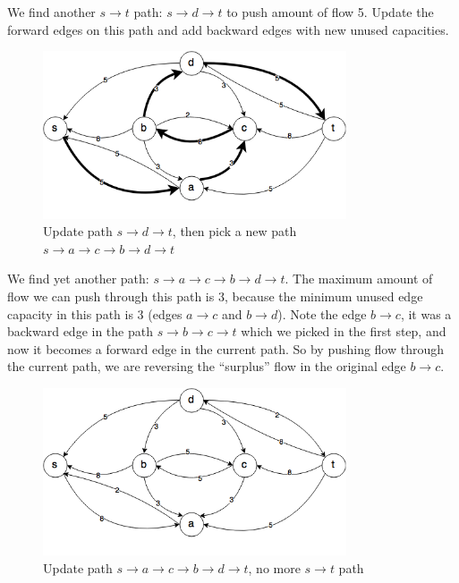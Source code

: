 \documentclass{article}
\begin{document}
We find another $s \rightarrow t$ path: $s \rightarrow d \rightarrow t$
to push amount of flow 5.
Update the forward edges on this path and add backward edges with new
unused capacities.

\begin{figure}[H]
\centering
\includegraphics[width=0.8\textwidth]{gf_3.png}
\caption{Update path $s \rightarrow d \rightarrow t$, 
then pick a new path $s \rightarrow a \rightarrow c \rightarrow b
\rightarrow d \rightarrow t$}
\end{figure}

We find yet another path: $s \rightarrow a \rightarrow c \rightarrow b
\rightarrow d \rightarrow t$. The maximum amount of flow we can push
through this path is 3, because the minimum unused edge capacity in this 
path is 3 (edges $a \rightarrow c$ and $b \rightarrow d$).
Note the edge $b \rightarrow c$, it was a backward edge in the path
$s \rightarrow b \rightarrow c \rightarrow t$ which we picked in the first
step, and now it becomes a forward edge in the current path.
So by pushing flow through the current path, we are reversing the 
``surplus'' flow in the original edge $b \rightarrow c$.

\begin{figure}[H]
\centering
\includegraphics[width=0.8\textwidth]{gf_4.png}
\caption{Update path $s \rightarrow a \rightarrow c \rightarrow b
\rightarrow d \rightarrow t$, no more $s \rightarrow t$ path}
\end{figure}
\end{document}
